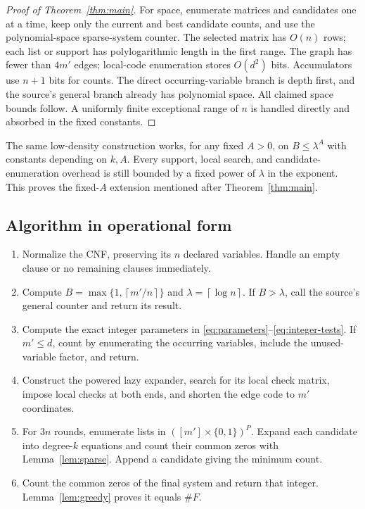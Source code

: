 \documentclass[11pt]{article}
\numberwithin{equation}{section}
\theoremstyle{definition}\newtheorem{definition}[theorem]{Definition}
\theoremstyle{remark}\newtheorem{remark}[theorem]{Remark}
\newcommand{\ceil}[1]{\left\lceil#1\right\rceil}
\begin{document}
\begin{proof}[Proof of Theorem~\ref{thm:main}]
For space, enumerate matrices and candidates one at a time, keep
only the current and best candidate counts, and use the
polynomial-space sparse-system counter. The selected matrix has
$O(n)$ rows; each list or support has polylogarithmic length in the
first range. The graph has fewer than $4m'$ edges; local-code
enumeration stores $O(d^2)$ bits. Accumulators use $n+1$ bits for
counts. The direct occurring-variable branch is depth first, and
the source's general branch already has polynomial space. All
claimed space bounds follow. A uniformly finite exceptional range
of $n$ is handled directly and absorbed in the fixed constants.
\end{proof}

The same low-density construction works, for any fixed $A>0$, on
$B\le\lambda^A$ with constants depending on $k,A$. Every support,
local search, and candidate-enumeration overhead is still bounded by
a fixed power of $\lambda$ in the exponent. This proves the
fixed-$A$ extension mentioned after Theorem~\ref{thm:main}.

\subsection{Algorithm in operational form}

\begin{enumerate}[leftmargin=*,itemsep=0.35em]
\item Normalize the CNF, preserving its $n$ declared variables. Handle
      an empty clause or no remaining clauses immediately.
\item Compute $B=\max\{1,\ceil{m'/n}\}$ and
      $\lambda=\ceil{\log n}$. If $B>\lambda$, call the source's
      general counter and return its result.
\item Compute the exact integer parameters in
      \eqref{eq:parameters}--\eqref{eq:integer-tests}. If $m'\le d$,
      count by enumerating the occurring variables, include the
      unused-variable factor, and return.
\item Construct the powered lazy expander, search for its local
      check matrix, impose local checks at both ends, and shorten
      the edge code to $m'$ coordinates.
\item For $3n$ rounds, enumerate lists in $([m']\times\{0,1\})^P$.
      Expand each candidate into degree-$k$ equations and count
      their common zeros with Lemma~\ref{lem:sparse}. Append a
      candidate giving the minimum count.
\item Count the common zeros of the final system and return that
      integer. Lemma~\ref{lem:greedy} proves it equals $\#F$.
\end{enumerate}
\end{document}
